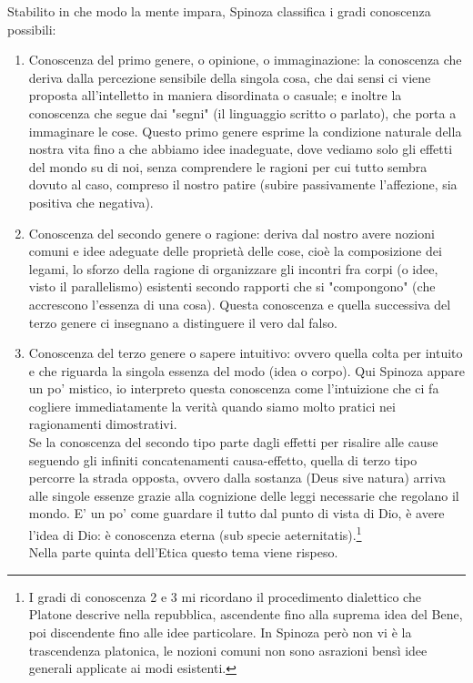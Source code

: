 Stabilito in che modo la mente impara, Spinoza classifica i gradi conoscenza possibili:
\begin{enumerate}
	\item Conoscenza del primo genere, o opinione, o immaginazione: la conoscenza che deriva dalla percezione sensibile della singola cosa, che dai sensi ci viene proposta all’intelletto in maniera disordinata o casuale; e inoltre la conoscenza che segue dai "segni" (il linguaggio scritto o parlato), che porta a immaginare le cose. Questo primo genere esprime la condizione naturale della nostra vita fino a che abbiamo idee inadeguate, dove vediamo solo gli effetti del mondo su di noi, senza comprendere le ragioni per cui tutto sembra dovuto al caso, compreso il nostro patire (subire passivamente l'affezione, sia positiva che negativa).
	\item Conoscenza del secondo genere o ragione: deriva dal nostro avere nozioni comuni e idee adeguate delle proprietà delle cose, cioè la composizione dei legami, lo sforzo della ragione di organizzare gli incontri fra corpi (o idee, visto il parallelismo) esistenti secondo rapporti che si "compongono" (che accrescono l'essenza di una cosa). Questa conoscenza e quella successiva del terzo genere ci insegnano a distinguere il vero dal falso.
	\item Conoscenza del terzo genere o sapere intuitivo: ovvero quella colta per intuito e che riguarda la singola essenza del modo (idea o corpo). Qui Spinoza appare un po' mistico, io interpreto questa conoscenza come l'intuizione che ci fa cogliere immediatamente la verità quando siamo molto pratici nei ragionamenti dimostrativi.\\
	Se la conoscenza del secondo tipo parte dagli effetti per risalire alle cause seguendo gli infiniti concatenamenti causa-effetto, quella di terzo tipo percorre la strada opposta, ovvero dalla sostanza (Deus sive natura) arriva alle singole essenze grazie alla cognizione delle leggi necessarie che regolano il mondo. E' un po' come guardare il tutto dal punto di vista di Dio, è avere l'idea di Dio: è conoscenza eterna (sub specie aeternitatis).\footnote{I gradi di conoscenza 2 e 3 mi ricordano il procedimento dialettico che Platone descrive nella repubblica, ascendente fino alla suprema idea del Bene, poi discendente fino alle idee particolare. In Spinoza però non vi è la trascendenza platonica, le nozioni comuni non sono asrazioni bensì idee generali applicate ai modi esistenti.}\\
	Nella parte quinta dell'Etica questo tema viene rispeso.
\end{enumerate}

